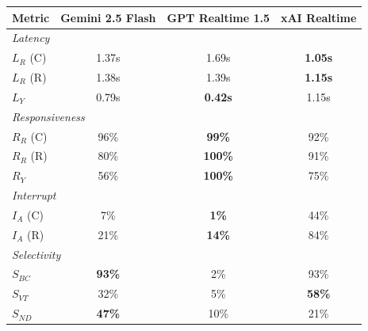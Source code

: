 \begin{tabular}{@{}lccc@{}}
\toprule
\textbf{Metric} & \textbf{Gemini 2.5 Flash} & \textbf{GPT Realtime 1.5} & \textbf{xAI Realtime} \\
\midrule
\multicolumn{4}{l}{\textit{Latency}} \\
$L_R$ (C) & 1.37s & 1.69s & \textbf{1.05s} \\
$L_R$ (R) & 1.38s & 1.39s & \textbf{1.15s} \\
$L_Y$ & 0.79s & \textbf{0.42s} & 1.15s \\
\midrule
\multicolumn{4}{l}{\textit{Responsiveness}} \\
$R_R$ (C) & 96\% & \textbf{99\%} & 92\% \\
$R_R$ (R) & 80\% & \textbf{100\%} & 91\% \\
$R_Y$ & 56\% & \textbf{100\%} & 75\% \\
\midrule
\multicolumn{4}{l}{\textit{Interrupt}} \\
$I_A$ (C) & 7\% & \textbf{1\%} & 44\% \\
$I_A$ (R) & 21\% & \textbf{14\%} & 84\% \\
\midrule
\multicolumn{4}{l}{\textit{Selectivity}} \\
$S_{BC}$ & \textbf{93\%} & 2\% & 93\% \\
$S_{VT}$ & 32\% & 5\% & \textbf{58\%} \\
$S_{ND}$ & \textbf{47\%} & 10\% & 21\% \\
\bottomrule
\end{tabular}